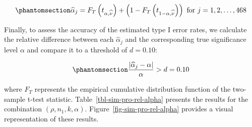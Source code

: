 \documentclass[
  12pt]{article}
\begin{document}
\begin{equation}\phantomsection\label{eq-type-I-error-rates}{\widehat{\alpha}_j = F_{T}\left(t_{\alpha,\widehat{\nu}}\right) + \left(1 - F_{T}\left(t_{1-\alpha,\widehat{\nu}}\right)\right) \text{ for } j = 1, 2, \ldots, 468}\end{equation}

Finally, to assess the accuracy of the estimated type I error rates, we
calculate the relative difference between each \(\widehat{\alpha}_j\)
and the corresponding true significance level \(\alpha\) and compare it
to a threshold of \(d=0.10\):

\begin{equation}\phantomsection\label{eq-pro-rel-alpha}{\frac{|\widehat{\alpha}_j - \alpha|}{\alpha} > d = 0.10}\end{equation}

where \(F_T\) represents the empirical cumulative distribution function
of the two-sample t-test statistic. Table~\ref{tbl-sim-pro-rel-alpha}
presents the results for the combination \((\rho, n_1, k, \alpha)\).
Figure~\ref{fig-sim-pro-rel-alpha} provides a visual representation of
these results.

\begingroup\fontsize{7}{9}\selectfont
\end{document}
